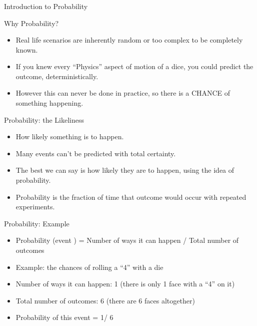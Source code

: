 \begin{frame}[fragile]\frametitle{}
\begin{center}
{\Large Introduction to Probability}
\end{center}
\end{frame}

\begin{frame}{Why Probability?}
\begin{itemize}
\item Real life scenarios are inherently random or too complex to be completely known. 
\item If you knew every ``Physics'' aspect of motion of a dice, you could predict the outcome, deterministically.
\item However this can never be done in practice, so there is a CHANCE of something happening.
\end{itemize}
\end{frame}

\begin{frame}{Probability: the Likeliness}
\begin{itemize}
\item How likely something is to happen. 
\item Many events can't be predicted with total certainty. 
\item The best we can say is how likely they are to happen, using the idea of probability. 
\item Probability is the fraction of time that outcome would occur with repeated experiments.
\end{itemize}
\end{frame}

\begin{frame}{Probability: Example}
\begin{itemize}
\item Probability (event ) = Number of ways it can happen / Total number of 
outcomes 
\item Example: the chances of rolling a ``4'' with a die 
\item Number of ways it can happen: 1 (there is only 1 face with a ``4'' on it) 
\item Total number of outcomes: 6 (there are 6 faces altogether) 
 \item Probability of  this event  = 1/ 6 
\end{itemize}
\end{frame}

